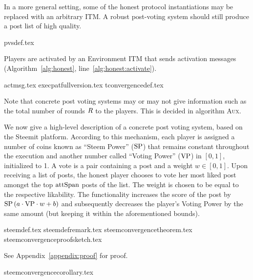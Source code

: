     In a more general setting, some of the honest protocol instantiations may be
    replaced with an arbitrary ITM. A robust post-voting system should still
    produce a post list of high quality.

    {pvsdef.tex}

    \noindent Players are activated by an Environment ITM that sends activation
    messages (Algorithm~\ref{alg:honest}, line~\ref{alg:honest:activate}).

    {actmsg.tex}
    {execpatfullversion.tex}
    {tconvergencedef.tex}

    \noindent Note that concrete post voting systems may or may not give
    information such as the total number of rounds $R$ to the players.
    This is decided in algorithm \textsc{Aux}.

    We now give a high-level description of a concrete post voting system, based
    on the Steemit platform. According to this mechanism, each player is
    assigned a number of coins known as ``Steem Power'' ($\mathrm{SP}$) that remains
    constant throughout the execution and another number called ``Voting Power''
    ($\mathrm{VP}$) in $\left[0, 1\right]$, initialized to 1. A vote is a pair
    containing a post and a weight $w \in \left[0, 1\right]$. Upon receiving a
    list of posts, the honest player chooses to vote her most liked post amongst
    the top $\mathrm{attSpan}$ posts of the list. The weight is chosen to be equal to
    the respective likability. The functionality increases the score of the post
    by $\mathrm{SP}\left(a \cdot \mathrm{VP} \cdot w + b\right)$ and subsequently
    decreases the player's Voting Power by the same amount (but keeping it
    within the aforementioned bounds).

    {steemdef.tex}
    {steemdefremark.tex}
    {steemconvergencetheorem.tex}
    {steemconvergenceproofsketch.tex}

    See Appendix~\ref{appendix:proof} for proof.

    {steemconvergencecorollary.tex}
